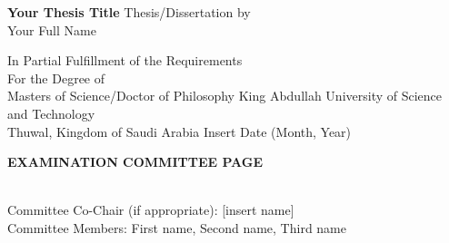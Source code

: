 \documentclass[onecolumn, 12 pt, doublespace, fullpage, letterpaper]{report}
\begin{document}

\vspace{2pt}
\thispagestyle{empty}
\addvspace{10mm}

\begin{center}

{\textbf{{\large Your Thesis Title}}}\vfill 
{Thesis/Dissertation by}\\
{ Your Full Name}\vfill



{ In Partial Fulfillment of the Requirements}\\[12pt]
{ For the Degree of}\\[12pt]
{Masters of Science/Doctor of Philosophy} \vfill
{King Abdullah University of Science and Technology }\\
{Thuwal, Kingdom of Saudi Arabia}
\vfill
{Insert Date (Month, Year)}

\end{center}

\newpage
{}
\begin{center}

\end{center}


\begin{center}

{ \textbf{{\large EXAMINATION COMMITTEE PAGE}}}\\\vspace{1cm}

\end{center}

\vspace{4\baselineskip}


\begin{onehalfspacing}
\\
Committee  Co-Chair (if appropriate): [insert name]\\
Committee Members: First name, Second name, Third name\vfill
\end{onehalfspacing}

\end{document}
